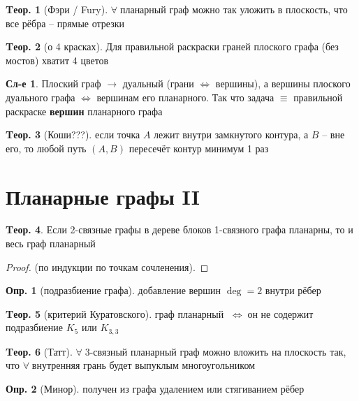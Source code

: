 \documentclass[a4paper,12pt]{article}
\theoremstyle{definition}
\newtheorem{definition}{Опр.}[section]
\theoremstyle{definition}
\newtheorem{theorem}{Tеор.}[section]
\newtheorem*{corollary}{Сл-е} %
\def\iiff{$\;\Longleftrightarrow\;$}
\def\iiany{$\forall\;$}
\begin{document}
\begin{theorem}[Фэри / Fury]
	\iiany планарный граф можно так уложить в плоскость, что все рёбра -- прямые отрезки 
\end{theorem}

\begin{theorem}[о 4 красках]
	Для правильной раскраски граней плоского графа (без мостов) хватит 4 цветов
\end{theorem}

\begin{corollary}
	Плоский граф $\longrightarrow$ дуальный (грани $\Leftrightarrow$ вершины), а вершины плоского дуального графа $\Leftrightarrow$ вершинам его планарного. Так что задача $\equiv$ правильной раскраске \textbf{вершин} планарного графа
\end{corollary}

\begin{theorem}[Коши???]
	если точка $A$ лежит внутри замкнутого контура, а $B$ -- вне его, то любой путь $(A,B)$ пересечёт контур минимум 1 раз
\end{theorem}


\section{Планарные графы II}

\begin{theorem}
	Если 2-связные графы в дереве блоков 1-связного графа планарны, то и весь граф планарный 
\end{theorem}
\begin{proof}
	(по индукции по точкам сочленения).
\end{proof}

\begin{definition}[подразбиение графа] добавление вершин $\deg=2$ внутри рёбер \end{definition}

\begin{theorem}[критерий Куратовского]
	граф планарный \iiff он не содержит подразбиение $K_5$ или $K_{3,3}$
\end{theorem}

\begin{theorem}[Татт]
	\iiany 3-связный планарный граф можно вложить на плоскость так, что \iiany внутренняя грань будет выпуклым многоугольником
\end{theorem}

\begin{definition}[Минор]
	получен из графа удалением или стягиванием рёбер
\end{definition}
\end{document}
